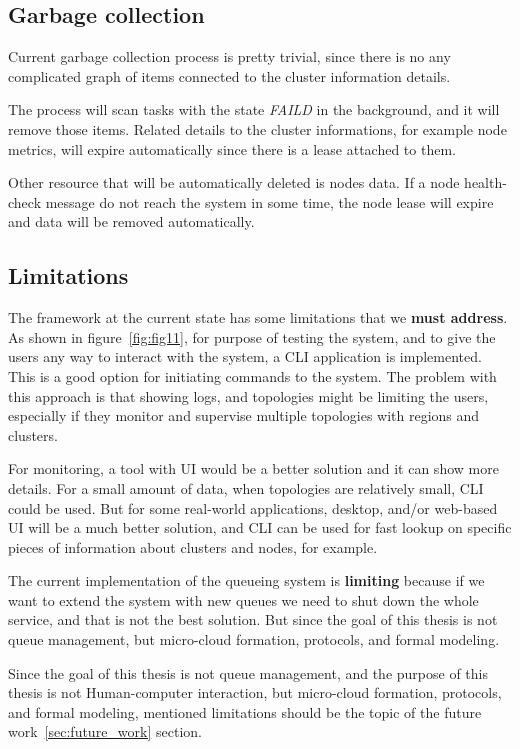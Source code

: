 \subsection{Garbage collection}\label{sec:gc}
%
Current garbage collection process is pretty trivial, since there is no any complicated graph of items connected to the cluster information details.

The process will scan tasks with the state \emph{FAILD} in the background, and it will remove those items. Related details to the cluster informations, for example node metrics, will expire automatically since there is a lease attached to them.

Other resource that will be automatically deleted is nodes data. If a node health-check message do not reach the system in some time, the node lease will expire and data will be removed automatically.
%
%
\subsection{Limitations}\label{sec:framework_limits}
% 
The framework at the current state has some limitations that we \textbf{must address}. As shown in figure~\ref{fig:fig11}, for purpose of testing the system, and to give the users any way to interact with the system, a CLI application is implemented. This is a good option for initiating commands to the system. The problem with this approach is that showing logs, and topologies might be limiting the users, especially if they monitor and supervise multiple topologies with regions and clusters.

For monitoring, a tool with UI would be a better solution and it can show more details. For a small amount of data, when topologies are relatively small, CLI could be used. But for some real-world applications, desktop, and/or web-based UI will be a much better solution, and CLI can be used for fast lookup on specific pieces of information about clusters and nodes, for example.

The current implementation of the queueing system is \textbf{limiting} because if we want to extend the system with new queues we need to shut down the whole service, and that is not the best solution. But since the goal of this thesis is not queue management, but micro-cloud formation, protocols, and formal modeling.

Since the goal of this thesis is not queue management, and the purpose of this thesis is not Human-computer interaction, but micro-cloud formation, protocols, and formal modeling, mentioned limitations should be the topic of the future work~\ref{sec:future_work} section.

